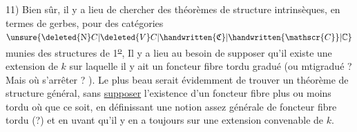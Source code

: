 11) Bien sûr, il y a lieu de chercher des théorèmes de structure intrinsèques, en termes de gerbes, pour des catégories $\unsure{\deleted{\mathrm N}C|\deleted{V}C|\handwritten{\mathfrak{C}}|\handwritten{\mathscr{C}}|\mathbb{C}}$ munies des structures de 1\textsuperscript{\uline{o}}, Il y a lieu au besoin de supposer qu'il existe une extension de $k$ sur laquelle il y ait un foncteur fibre tordu gradué (ou mtigradué ? Mais où s'arrêter ? ). Le plus beau serait évidemment de trouver un théorème de structure général, sans \uline{supposer} l'existence d'un foncteur fibre plus ou moins tordu où que ce soit, en définissant une notion assez générale de foncteur fibre tordu (?) et en uvant qu'il y en a toujours sur une extension convenable de $k$.
